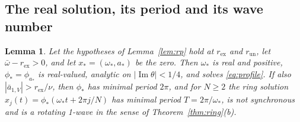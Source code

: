 \documentclass[11pt]{article}
\newtheorem{lemma}{Lemma}[section]
\theoremstyle{definition}
\newcommand{\im}{\operatorname{Im}}
\begin{document}
\subsection{The real solution, its period and its wave number}\label{sec:real}

\begin{lemma}\label{lem:real}
Let the hypotheses of Lemma~\ref{lem:rp} hold at $r_{\mathrm{ex}}$ and $r_{\mathrm{un}}$, let $\bar\omega - r_{\mathrm{ex}} > 0$, and let $x_* = (\omega_*, a_*)$ be the zero. Then $\omega_*$ is real and positive, $\phi_* = \phi_{a_*}$ is real-valued, analytic on $|\im\theta| < 1/4$, and solves \eqref{eq:profile}. If also $|\bar a_{1,V}| > r_{\mathrm{ex}}/\nu$, then $\phi_*$ has minimal period $2\pi$, and for $N \ge 2$ the ring solution $x_j(t) = \phi_*(\omega_*t + 2\pi j/N)$ has minimal period $T = 2\pi/\omega_*$, is not synchronous and is a rotating 1-wave in the sense of Theorem~\ref{thm:ring}(b).
\end{lemma}
\end{document}
